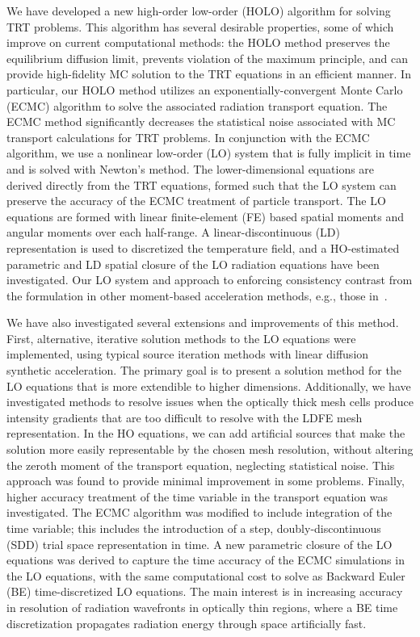 We have developed a new high-order low-order (HOLO) algorithm for solving TRT problems. This algorithm has several desirable
properties, some of which improve on current computational methods: the HOLO method preserves the equilibrium diffusion limit, prevents violation
of the maximum principle, and can provide high-fidelity MC solution to the TRT equations in an efficient
manner.  In particular, our HOLO method utilizes an exponentially-convergent
Monte Carlo (ECMC) algorithm to solve the associated radiation transport
equation.  The ECMC method significantly decreases the statistical noise
associated with MC transport calculations for TRT problems.  In conjunction with the ECMC
algorithm, we use a nonlinear
low-order (LO) system that is fully implicit in time and is solved with Newton's method. 
The lower-dimensional equations are derived directly from the TRT equations, formed such that the LO
system can preserve the accuracy of the ECMC treatment of particle transport.   The LO
equations are formed with linear finite-element (FE) based spatial moments and angular
moments over each half-range.  A linear-discontinuous (LD) representation is used to discretized
the temperature field, and a HO-estimated parametric and LD spatial closure of the LO
radiation equations have been investigated.  Our LO
system and approach to enforcing consistency contrast from the formulation in other
moment-based acceleration methods, e.g., those in~\cite{rmc,willert,park}.

We have also investigated several extensions and improvements of this method.  First,
alternative, iterative solution methods to the LO equations were implemented, using
typical source iteration methods with linear diffusion synthetic acceleration.  The primary goal is to present a solution
method for the LO equations that is more extendible to higher dimensions.
Additionally, we have investigated methods to resolve issues when the optically
thick mesh cells produce intensity gradients that are too difficult to resolve with the
LDFE mesh representation.   In the HO equations, we can add artificial sources that
make the solution more easily representable by the chosen mesh resolution, without
altering the zeroth moment of the transport equation, neglecting statistical noise.  This
approach was found to provide minimal improvement in some problems.
Finally, higher accuracy treatment of the time variable in the transport equation
was investigated.  The ECMC algorithm was modified to include integration
of the time variable; this includes the introduction of a step,
doubly-discontinuous (SDD) trial space representation in time.
A new parametric closure of the LO equations was derived to capture the time accuracy of
the ECMC simulations in the LO equations, with the same computational cost to solve as 
Backward Euler (BE) time-discretized LO equations.
 The main interest is in increasing accuracy in resolution of radiation wavefronts in optically
thin regions, where a BE time discretization propagates radiation energy through space artificially fast.


